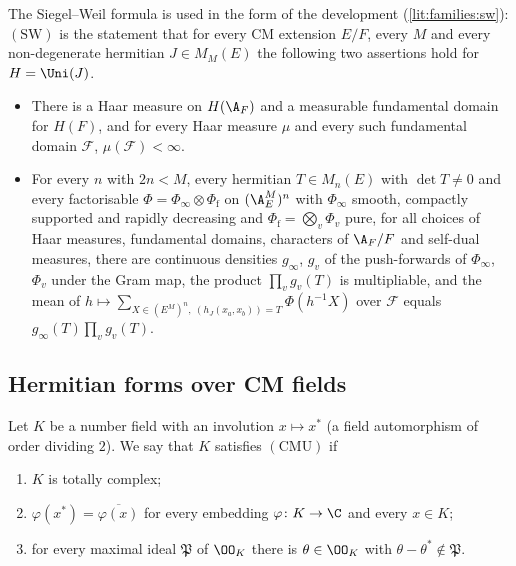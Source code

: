 \begin{definition}\label{pf:sh-flag:defsw}
The Siegel--Weil formula is used in the form of the development (\cref{lit:families:sw}): $(\mathrm{SW})$ is the
statement that for every CM extension $E/F$, every $M$ and every non-degenerate hermitian $J\in M_M(E)$ the
following two assertions hold for $H=\Uni(J)$.
\begin{itemize}
\item[$(\mathrm{SW}_1)$] There is a Haar measure on $H(\A_F)$ and a measurable fundamental domain for
$H(F)$, and for every Haar measure $\mu$ and every such fundamental domain $\mathcal F$,
$\mu(\mathcal F)<\infty$.
\item[$(\mathrm{SW}_2)$] For every $n$ with $2n<M$, every hermitian $T\in M_n(E)$ with $\det T\ne0$ and every
factorisable $\Phi=\Phi_\infty\otimes\Phi_{\mathrm f}$ on $(\A_E^M)^n$ with $\Phi_\infty$ smooth,
compactly supported and rapidly decreasing and $\Phi_{\mathrm f}=\bigotimes_v\Phi_v$ pure, for all choices of
Haar measures, fundamental domains, characters of $\A_F/F$ and self-dual measures, there are continuous
densities $g_\infty$, $g_v$ of the push-forwards of $\Phi_\infty$, $\Phi_v$ under the Gram map, the product
$\prod_vg_v(T)$ is multipliable, and the mean of $h\mapsto\sum_{X\in(E^M)^n,\ (h_J(x_a,x_b))=T}\Phi(h^{-1}X)$
over $\mathcal F$ equals $g_\infty(T)\prod_vg_v(T)$.
\end{itemize}
\end{definition}

\subsection{Hermitian forms over CM fields}\label{sec:pf:sh-flag:herm}

\begin{definition}\label{pf:sh-flag:defcmu}
Let $K$ be a number field with an involution $x\mapsto x^*$ (a field automorphism of order dividing $2$).
We say that $K$ satisfies $(\mathrm{CMU})$ if
\begin{enumerate}[label=(\roman*)]
\item $K$ is totally complex;
\item $\varphi(x^*)=\overline{\varphi(x)}$ for every embedding $\varphi\colon K\to\C$ and every $x\in K$;
\item for every maximal ideal $\mathfrak P$ of $\OO_K$ there is $\theta\in\OO_K$ with
$\theta-\theta^*\notin\mathfrak P$.
\end{enumerate}
\end{definition}


